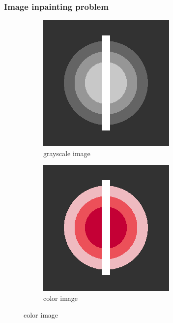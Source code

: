 \documentclass[xcolor=dvipsnames, xetex,serif]{beamer}
\begin{document}
    \begin{frame}
        \frametitle{Image inpainting problem}
        \begin{figure}[H]
            \centering
            \begin{subfigure}{0.4\linewidth}
                \centering
                \includegraphics[width=0.8\linewidth]{images/grayscale_inpaint/toinpaint.png}
                \caption*{{\large grayscale image}}
            \end{subfigure}
            \begin{subfigure}{0.4\linewidth}
                \centering
                \includegraphics[width=0.8\linewidth]{images/image_inpaint_synthetic/case02-toinpaint.png}
                \caption*{{\large color image}}
            \end{subfigure}
        \end{figure}
    \end{frame}
\end{document}
